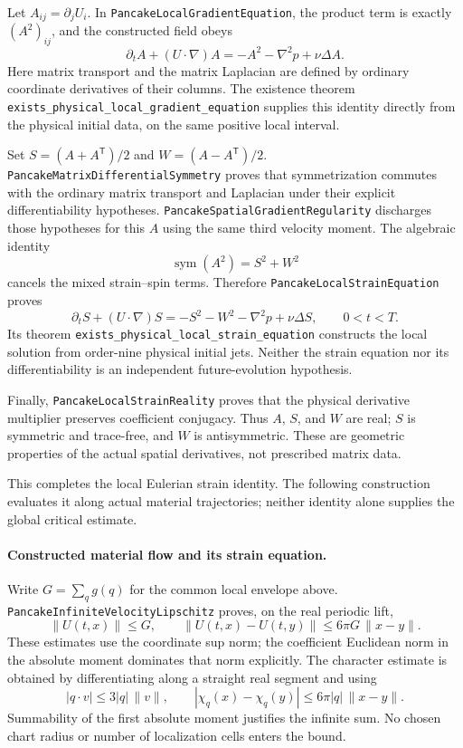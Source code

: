 \documentclass[11pt]{article}
\theoremstyle{definition}
\begin{document}
Let $A_{ij}=\partial_jU_i$. In \texttt{PancakeLocalGradientEquation},
the product term is exactly $(A^2)_{ij}$, and the constructed field obeys
\[
 \partial_t A+(U\cdot\nabla)A=-A^2-\nabla^2p+\nu\Delta A.
\]
Here matrix transport and the matrix Laplacian are defined by ordinary
coordinate derivatives of their columns. The existence theorem
\texttt{exists\_physical\_local\_gradient\_equation} supplies this identity
directly from the physical initial data, on the same positive local interval.

Set $S=(A+A^\mathsf T)/2$ and $W=(A-A^\mathsf T)/2$.
\texttt{PancakeMatrixDifferentialSymmetry} proves that symmetrization
commutes with the ordinary matrix transport and Laplacian under their
explicit differentiability hypotheses.
\texttt{PancakeSpatialGradientRegularity} discharges those hypotheses
for this $A$ using the same third velocity moment.
The algebraic identity
\[
 \operatorname{sym}(A^2)=S^2+W^2
\]
cancels the mixed strain--spin terms. Therefore
\texttt{PancakeLocalStrainEquation} proves
\[
 \boxed{\quad
 \partial_tS+(U\cdot\nabla)S
       =-S^2-W^2-\nabla^2p+\nu\Delta S,\qquad 0<t<T.
 \quad}
\]
Its theorem \texttt{exists\_physical\_local\_strain\_equation} constructs
the local solution from order-nine physical initial jets. Neither
the strain equation nor its differentiability is an independent
future-evolution hypothesis.

Finally, \texttt{PancakeLocalStrainReality} proves that the physical
derivative multiplier preserves coefficient conjugacy. Thus $A$, $S$,
and $W$ are real; $S$ is symmetric and trace-free, and $W$ is
antisymmetric. These are geometric properties of the actual spatial
derivatives, not prescribed matrix data.

This completes the local Eulerian strain identity. The following construction
evaluates it along actual material trajectories; neither identity alone
supplies the global critical estimate.

\paragraph{Constructed material flow and its strain equation.}
Write $G=\sum_q g(q)$ for the common local envelope above.
\texttt{PancakeInfiniteVelocityLipschitz} proves, on the real periodic lift,
\[
 \|U(t,x)\|\le G,\qquad
 \|U(t,x)-U(t,y)\|\le 6\pi G\,\|x-y\|.
\]
These estimates use the coordinate sup norm; the coefficient Euclidean
norm in the absolute moment dominates that norm explicitly.
The character estimate is obtained by differentiating along a straight
real segment and using
\[
 |q\cdot v|\le 3|q|\,\|v\|,\qquad
 |\chi_q(x)-\chi_q(y)|\le 6\pi|q|\,\|x-y\|.
\]
Summability of the first absolute moment justifies the infinite sum.
No chosen chart radius or number of localization cells enters the bound.
\end{document}
